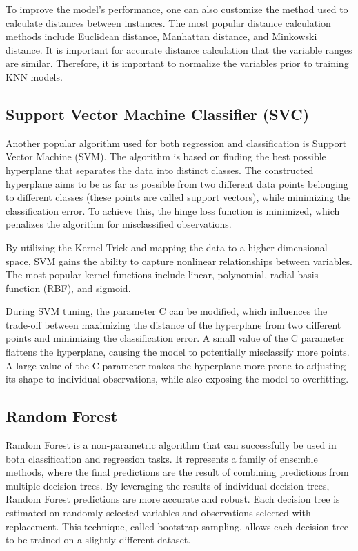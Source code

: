 To improve the model's performance, one can also customize the method used to calculate distances between instances. The most popular distance calculation methods include Euclidean distance, Manhattan distance, and Minkowski distance. It is important for accurate distance calculation that the variable ranges are similar. Therefore, it is important to normalize the variables prior to training KNN models.

\subsection{Support Vector Machine Classifier (SVC)}
Another popular algorithm used for both regression and classification is Support Vector Machine (SVM). The algorithm is based on finding the best possible hyperplane that separates the data into distinct classes. The constructed hyperplane aims to be as far as possible from two different data points belonging to different classes (these points are called support vectors), while minimizing the classification error. To achieve this, the hinge loss function is minimized, which penalizes the algorithm for misclassified observations.

By utilizing the Kernel Trick and mapping the data to a higher-dimensional space, SVM gains the ability to capture nonlinear relationships between variables. The most popular kernel functions include linear, polynomial, radial basis function (RBF), and sigmoid.

During SVM tuning, the parameter C can be modified, which influences the trade-off between maximizing the distance of the hyperplane from two different points and minimizing the classification error. A small value of the C parameter flattens the hyperplane, causing the model to potentially misclassify more points. A large value of the C parameter makes the hyperplane more prone to adjusting its shape to individual observations, while also exposing the model to overfitting.

\subsection{Random Forest}
Random Forest is a non-parametric algorithm that can successfully be used in both classification and regression tasks. It represents a family of ensemble methods, where the final predictions are the result of combining predictions from multiple decision trees. By leveraging the results of individual decision trees, Random Forest predictions are more accurate and robust. Each decision tree is estimated on randomly selected variables and observations selected with replacement. This technique, called bootstrap sampling, allows each decision tree to be trained on a slightly different dataset.

